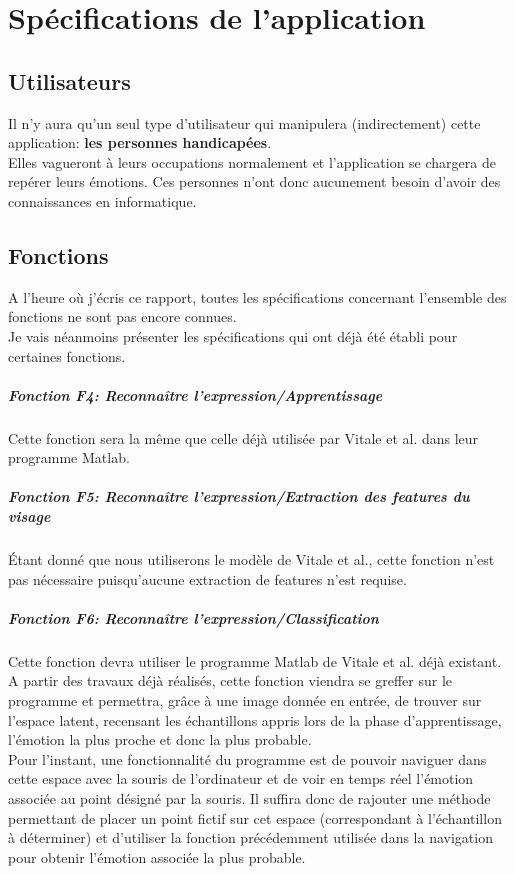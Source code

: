 \documentclass[poster]{polytech/polytech}
\begin{document}
\newpage
\chapter{Spécifications de l'application}
\label{chap:chap_specif}

\section{Utilisateurs}
Il n'y aura qu'un seul type d'utilisateur qui manipulera (indirectement) cette application: \textbf{les personnes handicapées}.\\
Elles vagueront à leurs occupations normalement et l'application se chargera de repérer leurs émotions. Ces personnes n'ont donc aucunement besoin d'avoir des connaissances en informatique.

\section{Fonctions}
A l'heure où j'écris ce rapport, toutes les spécifications concernant l'ensemble des fonctions ne sont pas encore connues.\\
Je vais néanmoins présenter les spécifications qui ont déjà été établi pour certaines fonctions.


\paragraph{Fonction F4: Reconnaître l'expression/Apprentissage}
Cette fonction sera la même que celle déjà utilisée par Vitale et al. dans leur programme Matlab.

\paragraph{Fonction F5: Reconnaître l'expression/Extraction des \textit{features} du visage}
Étant donné que nous utiliserons le modèle de Vitale et al., cette fonction n'est pas nécessaire puisqu'aucune extraction de features n'est requise.

\paragraph{Fonction F6: Reconnaître l'expression/Classification}
Cette fonction devra utiliser le programme Matlab de Vitale et al. déjà existant. A partir des travaux déjà réalisés, cette fonction viendra se greffer sur le programme et permettra, grâce à une image donnée en entrée, de trouver sur l'espace latent, recensant les échantillons appris lors de la phase d'apprentissage, l'émotion la plus proche et donc la plus probable.\\
Pour l'instant, une fonctionnalité du programme est de pouvoir naviguer dans cette espace avec la souris de l'ordinateur et de voir en temps réel l'émotion associée au point désigné par la souris. Il suffira donc de rajouter une méthode permettant de placer un point fictif sur cet espace (correspondant à l'échantillon à déterminer) et d'utiliser la fonction précédemment utilisée dans la navigation pour obtenir l'émotion associée la plus probable.
\end{document}
